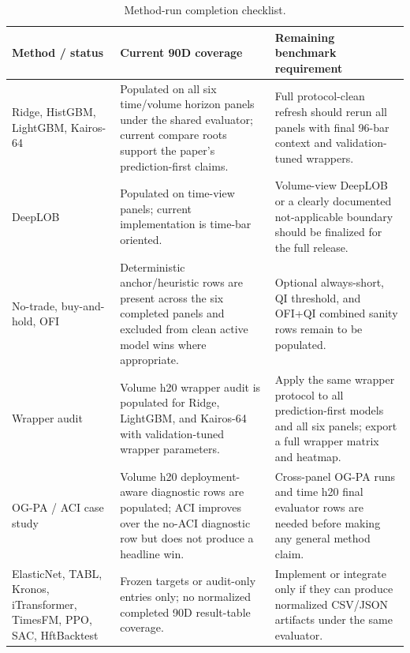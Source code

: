 \begin{table}[t]
\centering
\caption{Method-run completion checklist.}
\label{tab:table_21_method_completion}
\begin{tabular}{lll}
\toprule
Method / status & Current 90D coverage & Remaining benchmark requirement \\
\midrule
Ridge, HistGBM, LightGBM, Kairos-64 & Populated on all six time/volume horizon panels under the shared evaluator; current compare roots support the paper's prediction-first claims. & Full protocol-clean refresh should rerun all panels with final 96-bar context and validation-tuned wrappers. \\
DeepLOB & Populated on time-view panels; current implementation is time-bar oriented. & Volume-view DeepLOB or a clearly documented not-applicable boundary should be finalized for the full release. \\
No-trade, buy-and-hold, OFI & Deterministic anchor/heuristic rows are present across the six completed panels and excluded from clean active model wins where appropriate. & Optional always-short, QI threshold, and OFI+QI combined sanity rows remain to be populated. \\
Wrapper audit & Volume h20 wrapper audit is populated for Ridge, LightGBM, and Kairos-64 with validation-tuned wrapper parameters. & Apply the same wrapper protocol to all prediction-first models and all six panels; export a full wrapper matrix and heatmap. \\
OG-PA / ACI case study & Volume h20 deployment-aware diagnostic rows are populated; ACI improves over the no-ACI diagnostic row but does not produce a headline win. & Cross-panel OG-PA runs and time h20 final evaluator rows are needed before making any general method claim. \\
ElasticNet, TABL, Kronos, iTransformer, TimesFM, PPO, SAC, HftBacktest & Frozen targets or audit-only entries only; no normalized completed 90D result-table coverage. & Implement or integrate only if they can produce normalized CSV/JSON artifacts under the same evaluator. \\
\bottomrule
\end{tabular}
\end{table}
